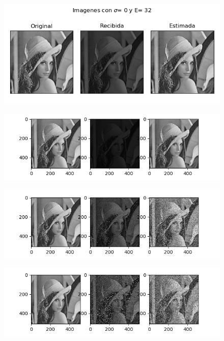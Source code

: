 \begin{figure}[H]
	\includegraphics[scale=1]{Imagenes/E32S00}
	\centering
\end{figure}

\begin{figure}[H]
	\includegraphics[scale=1]{Imagenes/E32S01}
	\centering
\end{figure}
 
\begin{figure}[H]
	\includegraphics[scale=1]{Imagenes/E32S10}
	\centering
\end{figure}

\begin{figure}[H]
	\includegraphics[scale=1]{Imagenes/E32S20}
	\centering
\end{figure}

